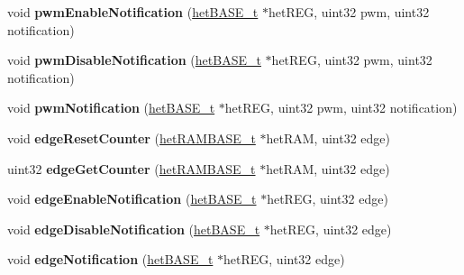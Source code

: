 \begin{DoxyCompactItemize}
\item 
\mbox{\label{group__HET_gac40fd6a594cc5e4accdc32573a88aa9f}} 
void {\bfseries pwm\+Enable\+Notification} (\mbox{\hyperlink{reg__het_8h_ad33493e7f48cca3db8ffa5c71289ba1a}{het\+B\+A\+S\+E\+\_\+t}} $\ast$het\+R\+EG, uint32 pwm, uint32 notification)
\item 
\mbox{\label{group__HET_ga56042328a378a4aabca676e2c73b1d1e}} 
void {\bfseries pwm\+Disable\+Notification} (\mbox{\hyperlink{reg__het_8h_ad33493e7f48cca3db8ffa5c71289ba1a}{het\+B\+A\+S\+E\+\_\+t}} $\ast$het\+R\+EG, uint32 pwm, uint32 notification)
\item 
\mbox{\label{group__HET_ga1a0c06c5fa42eaac589bc5eadc2e64b9}} 
void {\bfseries pwm\+Notification} (\mbox{\hyperlink{reg__het_8h_ad33493e7f48cca3db8ffa5c71289ba1a}{het\+B\+A\+S\+E\+\_\+t}} $\ast$het\+R\+EG, uint32 pwm, uint32 notification)
\item 
\mbox{\label{group__HET_gae6d2fcb5598aae5edd6c3c8ccb514937}} 
void {\bfseries edge\+Reset\+Counter} (\mbox{\hyperlink{reg__het_8h_aff6a3de4d5a894a32134243e0d87bb32}{het\+R\+A\+M\+B\+A\+S\+E\+\_\+t}} $\ast$het\+R\+AM, uint32 edge)
\item 
\mbox{\label{group__HET_ga63ee91d30807cbf605307760598b974b}} 
uint32 {\bfseries edge\+Get\+Counter} (\mbox{\hyperlink{reg__het_8h_aff6a3de4d5a894a32134243e0d87bb32}{het\+R\+A\+M\+B\+A\+S\+E\+\_\+t}} $\ast$het\+R\+AM, uint32 edge)
\item 
\mbox{\label{group__HET_ga14b09dede4585467bfa52d5e8145b851}} 
void {\bfseries edge\+Enable\+Notification} (\mbox{\hyperlink{reg__het_8h_ad33493e7f48cca3db8ffa5c71289ba1a}{het\+B\+A\+S\+E\+\_\+t}} $\ast$het\+R\+EG, uint32 edge)
\item 
\mbox{\label{group__HET_ga570d4df11cf8b9afdc4f715057aeaa0c}} 
void {\bfseries edge\+Disable\+Notification} (\mbox{\hyperlink{reg__het_8h_ad33493e7f48cca3db8ffa5c71289ba1a}{het\+B\+A\+S\+E\+\_\+t}} $\ast$het\+R\+EG, uint32 edge)
\item 
\mbox{\label{group__HET_ga3005754a7d9958621c0c474bba3cb6ec}} 
void {\bfseries edge\+Notification} (\mbox{\hyperlink{reg__het_8h_ad33493e7f48cca3db8ffa5c71289ba1a}{het\+B\+A\+S\+E\+\_\+t}} $\ast$het\+R\+EG, uint32 edge)

\end{DoxyCompactItemize}
